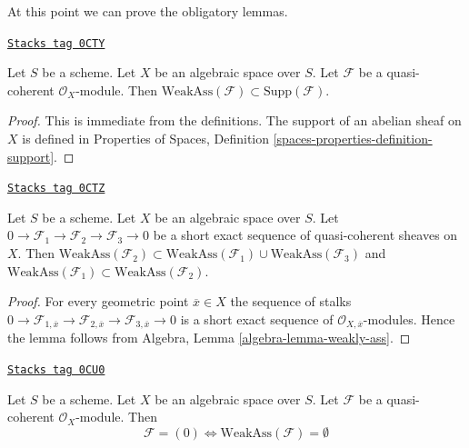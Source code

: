 At this point we can prove the obligatory lemmas.

\begin{lemma}
\label{spaces-divisors-lemma-weakly-ass-support}
\href{https://stacks.math.columbia.edu/tag/0CTY}{\texttt{Stacks tag 0CTY}}

Let $S$ be a scheme. Let $X$ be an algebraic space over $S$.
Let $\mathcal{F}$ be a quasi-coherent $\mathcal{O}_X$-module.
Then $\text{WeakAss}(\mathcal{F}) \subset \text{Supp}(\mathcal{F})$.
\end{lemma}

\begin{proof}
This is immediate from the definitions. The support of an abelian sheaf
on $X$ is defined in Properties of Spaces, Definition
\ref{spaces-properties-definition-support}.
\end{proof}

\begin{lemma}
\label{spaces-divisors-lemma-ses-weakly-ass}
\href{https://stacks.math.columbia.edu/tag/0CTZ}{\texttt{Stacks tag 0CTZ}}

Let $S$ be a scheme. Let $X$ be an algebraic space over $S$.
Let $0 \to \mathcal{F}_1 \to \mathcal{F}_2 \to \mathcal{F}_3 \to 0$
be a short exact sequence of quasi-coherent sheaves on $X$.
Then
$\text{WeakAss}(\mathcal{F}_2) \subset
\text{WeakAss}(\mathcal{F}_1) \cup \text{WeakAss}(\mathcal{F}_3)$
and
$\text{WeakAss}(\mathcal{F}_1) \subset \text{WeakAss}(\mathcal{F}_2)$.
\end{lemma}

\begin{proof}
For every geometric point $\overline{x} \in X$
the sequence of stalks
$0 \to \mathcal{F}_{1, \overline{x}} \to
\mathcal{F}_{2, \overline{x}} \to
\mathcal{F}_{3, \overline{x}} \to 0$
is a short exact sequence of $\mathcal{O}_{X, \overline{x}}$-modules.
Hence the lemma follows from
Algebra, Lemma \ref{algebra-lemma-weakly-ass}.
\end{proof}

\begin{lemma}
\label{spaces-divisors-lemma-weakly-ass-zero}
\href{https://stacks.math.columbia.edu/tag/0CU0}{\texttt{Stacks tag 0CU0}}

Let $S$ be a scheme. Let $X$ be an algebraic space over $S$.
Let $\mathcal{F}$ be a quasi-coherent $\mathcal{O}_X$-module.
Then
$$
\mathcal{F} = (0) \Leftrightarrow \text{WeakAss}(\mathcal{F}) = \emptyset
$$
\end{lemma}

